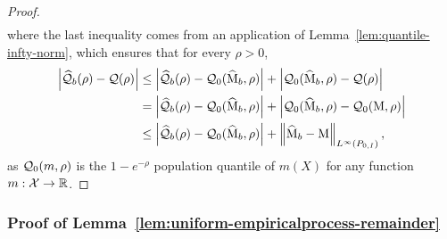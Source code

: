 \begin{proof}
\begin{align*}
\end{align*}
where the last inequality comes from an application of Lemma~\ref{lem:quantile-infty-norm},  which ensures that for every $\rho > 0$,
\begin{align*}
\left|\widehat{\mathcal{Q}}_b(\rho) - \mathcal{Q}(\rho) \right| 
&\le \left|\widehat{\mathcal{Q}}_b(\rho) - \mathcal{Q}_0(\widehat{\operatorname*{M}}_b, \rho) \right| + \left| \mathcal{Q}_0( \widehat{\operatorname*{M}}_b, \rho ) - \mathcal{Q}(\rho) \right| \\
&=\left|\widehat{\mathcal{Q}}_b(\rho) - \mathcal{Q}_0(\widehat{\operatorname*{M}}_b, \rho) \right| + \left| \mathcal{Q}_0( \widehat{\operatorname*{M}}_b, \rho ) - \mathcal{Q}_0(\operatorname*{M}, \rho) \right| \\ &\le \left|\widehat{\mathcal{Q}}_b(\rho) - \mathcal{Q}_0(\widehat{\operatorname*{M}}_b, \rho) \right| + \left\|{ \widehat{\operatorname*{M}}_b - \operatorname*{M}}\right\|_{L^\infty(P_{0,I})},
\end{align*}
as $\mathcal{Q}_0(m, \rho )$ is the $1-e^{-\rho}$ population quantile of $m(X)$ for any function $m : \mathcal{X} \to \mathbb{R}$.
\end{proof}

\subsubsection{Proof of Lemma~\ref{lem:uniform-empiricalprocess-remainder}}


